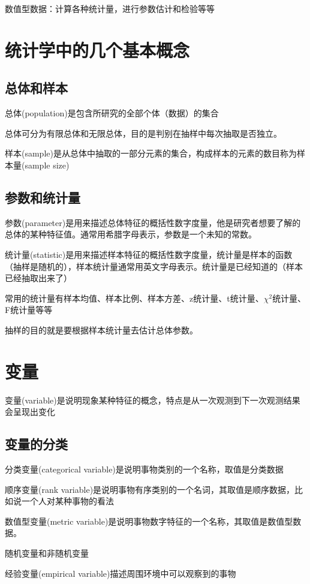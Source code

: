 \documentclass[UTF8,10pt]{book}
\begin{document}
    数值型数据：计算各种统计量，进行参数估计和检验等等
    
    \section{统计学中的几个基本概念}
    \subsection{总体和样本}
    总体(population)是包含所研究的全部个体（数据）的集合

    总体可分为有限总体和无限总体，目的是判别在抽样中每次抽取是否独立。

    样本(sample)是从总体中抽取的一部分元素的集合，构成样本的元素的数目称为样本量(sample size)

    \subsection{参数和统计量}
    参数(parameter)是用来描述总体特征的概括性数字度量，他是研究者想要了解的总体的某种特征值。通常用希腊字母表示，参数是一个未知的常数。

    统计量(statistic)是用来描述样本特征的概括性数字度量，统计量是样本的函数（抽样是随机的），样本统计量通常用英文字母表示。统计量是已经知道的（样本已经抽取出来了）

    常用的统计量有样本均值、样本比例、样本方差、z统计量、t统计量、$\chi^2$统计量、F统计量等等

    抽样的目的就是要根据样本统计量去估计总体参数。

    \section{变量}
    变量(variable)是说明现象某种特征的概念，特点是从一次观测到下一次观测结果会呈现出变化

    \subsection{变量的分类}
    分类变量(categorical variable)是说明事物类别的一个名称，取值是分类数据

    顺序变量(rank variable)是说明事物有序类别的一个名词，其取值是顺序数据，比如说一个人对某种事物的看法

    数值型变量(metric variable)是说明事物数字特征的一个名称，其取值是数值型数据。

    随机变量和非随机变量

    经验变量(empirical variable)描述周围环境中可以观察到的事物
    
\end{document}
